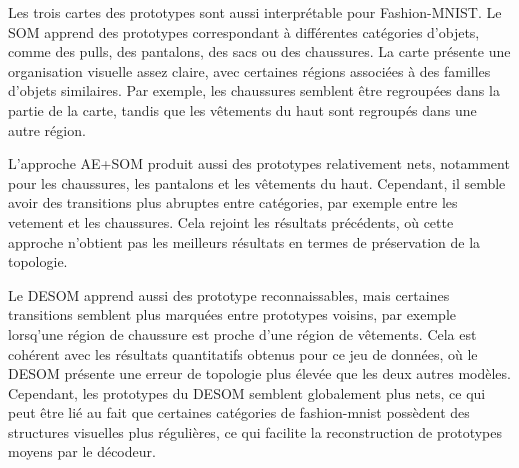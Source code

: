 \documentclass[12pt,a4paper]{report}
\begin{document}
Les trois cartes des prototypes sont aussi interprétable pour Fashion-MNIST.
Le SOM apprend des prototypes correspondant à différentes catégories d'objets, comme des pulls, des pantalons, des sacs ou des chaussures.
La carte présente une organisation visuelle assez claire, avec certaines régions associées à des familles d'objets similaires.
Par exemple, les chaussures semblent être regroupées dans la partie de la carte, tandis que les vêtements du haut sont regroupés dans une autre région.

L'approche AE+SOM produit aussi des prototypes relativement nets, notamment pour les chaussures, les pantalons et les vêtements du haut.
Cependant, il semble avoir des transitions plus abruptes entre catégories, par exemple entre les vetement et les chaussures.
Cela rejoint les résultats précédents, où cette approche n'obtient pas les meilleurs résultats en termes de préservation de la topologie.

Le DESOM apprend aussi des prototype reconnaissables, mais certaines transitions semblent plus marquées entre prototypes voisins, par exemple lorsq'une région de chaussure 
est proche d'une région de vêtements.
Cela est cohérent avec les résultats quantitatifs obtenus pour ce jeu de données, où le DESOM présente une erreur de topologie plus élevée que les deux autres modèles.
Cependant, les prototypes du DESOM semblent globalement plus nets, ce qui peut être lié au fait que certaines catégories de fashion-mnist possèdent 
des structures visuelles plus régulières, ce qui facilite la reconstruction de prototypes moyens par le décodeur.
\end{document}
